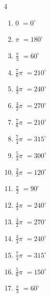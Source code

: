 \begin{multicols}{4}
\begin{enumerate}
  \item $\displaystyle 0$
        $\displaystyle =0^{\circ}$

  \item $\displaystyle \pi$
        $\displaystyle =180^{\circ}$

  \item $\displaystyle \frac{\pi}{3}$
        $\displaystyle =60^{\circ}$

  \item $\displaystyle \frac{7}{6}\pi$
        $\displaystyle =210^{\circ}$

  \item $\displaystyle \frac{4}{3}\pi$
        $\displaystyle =240^{\circ}$

  \item $\displaystyle \frac{3}{2}\pi$
        $\displaystyle =270^{\circ}$

  \item $\displaystyle \frac{7}{6}\pi$
        $\displaystyle =210^{\circ}$

  \item $\displaystyle \frac{7}{4}\pi$
        $\displaystyle =315^{\circ}$

  \item $\displaystyle \frac{5}{3}\pi$
        $\displaystyle =300^{\circ}$

  \item $\displaystyle \frac{2}{3}\pi$
        $\displaystyle =120^{\circ}$

  \item $\displaystyle \frac{\pi}{2}$
        $\displaystyle =90^{\circ}$

  \item $\displaystyle \frac{4}{3}\pi$
        $\displaystyle =240^{\circ}$

  \item $\displaystyle \frac{3}{2}\pi$
        $\displaystyle =270^{\circ}$

  \item $\displaystyle \frac{4}{3}\pi$
        $\displaystyle =240^{\circ}$

  \item $\displaystyle \frac{7}{4}\pi$
        $\displaystyle =315^{\circ}$

  \item $\displaystyle \frac{5}{6}\pi$
        $\displaystyle =150^{\circ}$

  \item $\displaystyle \frac{\pi}{3}$
        $\displaystyle =60^{\circ}$


\end{enumerate}
\end{multicols}
